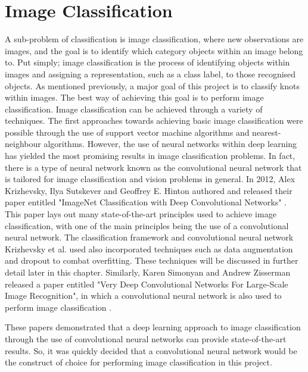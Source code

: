 \documentclass{l4proj}
\begin{document}
\section{Image Classification}
A sub-problem of classification is image classification, where new observations are images, and the goal is to identify which category objects within an image belong to.
Put simply; image classification is the process of identifying objects within images and assigning a representation, such as a class label, to those recognised objects.
As mentioned previously, a major goal of this project is to classify knots within images.
The best way of achieving this goal is to perform image classification.
Image classification can be achieved through a variety of techniques.
The first approaches towards achieving basic image classification were possible through the use of support vector machine algorithms and nearest-neighbour algorithms.
However, the use of neural networks within deep learning has yielded the most promising results in image classification problems.
In fact, there is a type of neural network known as the convolutional neural network that is tailored for image classification and vision problems in general.
In 2012, Alex Krizhevsky, Ilya Sutskever and Geoffrey E. Hinton authored and released their paper entitled "ImageNet Classification with Deep Convolutional Networks" \cite{Krizhevsky:2012:ICD:2999134.2999257}.
This paper lays out many state-of-the-art principles used to achieve image classification, with one of the main principles being the use of a convolutional neural network.
The classification framework and convolutional neural network Krizhevsky et al. used also incorporated techniques such as data augmentation and dropout to combat overfitting.
These techniques will be discussed in further detail later in this chapter.
Similarly, Karen Simonyan and Andrew Zisserman released a paper entitled "Very Deep Convolutional Networks For Large-Scale Image Recognition", in which a convolutional neural network is also used to perform image classification \cite{DBLP:journals/corr/SimonyanZ14a}.

These papers demonstrated that a deep learning approach to image classification through the use of convolutional neural networks can provide state-of-the-art results.
So, it was quickly decided that a convolutional neural network would be the construct of choice for performing image classification in this project.
\end{document}
